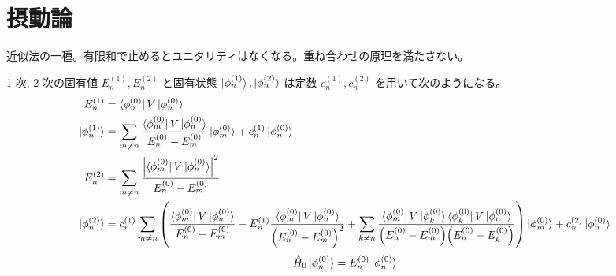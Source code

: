 \documentclass[uplatex,dvipdfmx,a4paper,11pt]{jlreq}
\theoremstyle{definition}
\begin{document}
\section{摂動論}
近似法の一種。有限和で止めるとユニタリティはなくなる。重ね合わせの原理を満たさない。
\begin{proposition}
  1 次, 2 次の固有値 $E_n^{(1)}, E_n^{(2)}$ と固有状態 $\ket{\phi_n^{(1)}}, \ket{\phi_n^{(2)}}$ は定数 $c_n^{(1)}, c_n^{(2)}$ を用いて次のようになる。
  \begin{align}
    E_n^{(1)}          & = \bra{\phi_n^{(0)}}V\ket{\phi_n^{(0)}}                                                                                                                                                                                                                                                                                                                                                             \\
    \ket{\phi_n^{(1)}} & = \sum_{m\neq n}\frac{\bra{\phi_m^{(0)}}V\ket{\phi_n^{(0)}}}{E_n^{(0)} - E_m^{(0)}}\ket{\phi_m^{(0)}} + c_n^{(1)}\ket{\phi_n^{(0)}}                                                                                                                                                                                                                                                                 \\
    E_n^{(2)}          & = \sum_{m\neq n}\frac{\qty|\bra{\phi_m^{(0)}}V\ket{\phi_n^{(0)}}|^2}{E_n^{(0)} - E_m^{(0)}}                                                                                                                                                                                                                                                                                                         \\
    \ket{\phi_n^{(2)}} & = c_n^{(1)}\sum_{m\neq n}\qty(\frac{\bra{\phi_m^{(0)}}V\ket{\phi_n^{(0)}}}{E_n^{(0)} - E_m^{(0)}} - E_n^{(1)}\frac{\bra{\phi_m^{(0)}}V\ket{\phi_n^{(0)}}}{\qty(E_n^{(0)} - E_m^{(0)})^2} + \sum_{k\neq n}\frac{\bra{\phi_m^{(0)}}V\ket{\phi_k^{(0)}}\bra{\phi_k^{(0)}}V\ket{\phi_n^{(0)}}}{\qty(E_n^{(0)} - E_m^{(0)})\qty(E_n^{(0)} - E_k^{(0)})})\ket{\phi_m^{(0)}} + c_n^{(2)}\ket{\phi_n^{(0)}}
  \end{align}
  \begin{align}
    \hat{H}_0\ket{\phi_n^{(0)}} = E_n^{(0)}\ket{\phi_n^{(0)}}
  \end{align}
\end{proposition}
\end{document}
